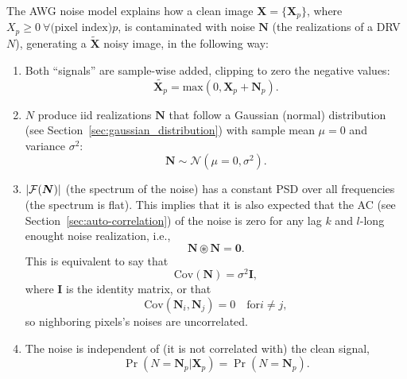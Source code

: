 The \gls{AWG} noise model explains how a clean image
$\bm{X}=\{\bm{X}_p\}$, where
$X_p\ge 0~\forall \text{(pixel~index)} p$, is contaminated with noise
$\bm{N}$ (the realizations of a \gls{DRV} $N$), generating a
$\tilde{\bm{X}}$ noisy image, in the following way:
\begin{enumerate}
\item Both ``signals'' are sample-wise added, clipping to zero the
  negative values:
  \begin{equation}
    \tilde{\bm{X}_p} = \text{max}(0, \bm{X}_p + \bm{N}_p).
    \label{eq:AWG}
  \end{equation}
\item $N$ produce \gls{iid} realizations $\bm{N}$ that follow a Gaussian
  (normal) distribution (see Section~\ref{sec:gaussian_distribution})
  with sample mean $\mu=0$ and variance $\sigma^2$:
  \begin{equation}
    \bm{N}\sim{\mathcal N}(\mu=0,\sigma^2).
  \end{equation}
\item $|{\cal F}(\bm{N})|$ (the spectrum of the noise) has a constant
  \gls{PSD} over all frequencies (the spectrum is flat). This implies
  that it is also expected that the \gls{AC} (see
  Section~\ref{sec:auto-correlation}) of the noise is zero for any lag
  $k$ and $l$-long enought noise realization, i.e.,
  \begin{equation}
    \bm{N}\circledast\bm{N}=\bm{0}.
  \end{equation}
  This is equivalent to say that
  \begin{equation}
    \text{Cov}(\bm{N}) = \sigma^2\bm{I},
  \end{equation}
  where $\bm{I}$ is the identity matrix, or that
  \begin{equation}
    \text{Cov}(\bm{N}_i,\bm{N}_j) = 0\quad\text{for} i\neq j,
  \end{equation}
  so nighboring pixels's noises are uncorrelated.
\item The noise is independent of (it is not correlated with) the clean signal,
\begin{equation}
  \Pr(N{=}\bm{N}_p|\bm{X}_p) = \Pr(N{=}\bm{N}_p).
\end{equation}
  
\end{enumerate}

